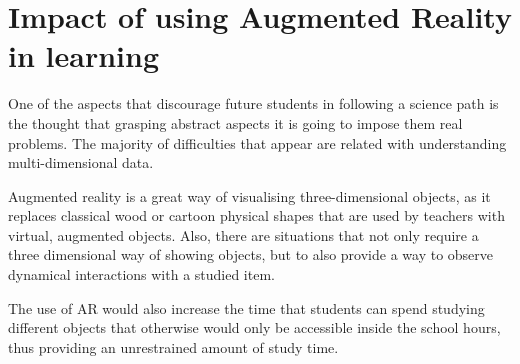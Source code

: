 \documentclass[12 pct]{report}
\begin{document}
\section{Impact of using Augmented Reality in learning}
One of the aspects that discourage future students in following a science path is the thought that grasping abstract aspects it is going to impose them real problems. The majority of difficulties that appear are related with understanding multi-dimensional data.

Augmented reality is a great way of visualising three-dimensional objects, as it replaces classical wood or cartoon physical shapes that are used by teachers with virtual, augmented objects. Also, there are situations that not only require a three dimensional way of showing objects, but to also provide a way to observe dynamical interactions with a studied item.

The use of AR would also increase the time that students can spend studying different objects that otherwise would only be accessible inside the school hours, thus providing an unrestrained amount of study time.
\end{document}
